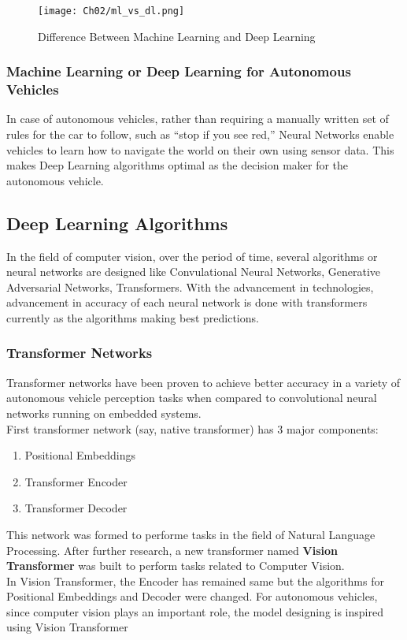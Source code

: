 \begin{figure}[h]
    \centering
    \texttt{[image: Ch02/ml\_vs\_dl.png]}
    \caption{Difference Between Machine Learning and Deep Learning}
    \label{figure:2}
\end{figure}
\FloatBarrier

\subsubsection{Machine Learning or Deep Learning for Autonomous Vehicles}
In case of autonomous vehicles, rather than requiring a manually written set of rules for the car to follow, such as “stop if you see red,” Neural Networks enable vehicles to learn how to navigate the world on their own using sensor data. This makes Deep Learning algorithms optimal as the decision maker for the autonomous vehicle. 

\subsection{Deep Learning Algorithms}
In the field of computer vision, over the period of time, several algorithms or neural networks are designed like Convulational Neural Networks, Generative Adversarial Networks, Transformers. With the advancement in technologies, advancement in accuracy of each neural network is done with transformers currently as the algorithms making best predictions.

\subsubsection{Transformer Networks}
Transformer networks have been proven to achieve better accuracy in a variety of autonomous vehicle perception tasks when compared to convolutional neural networks running on embedded systems.
\\
First transformer network (say, native transformer)\cite{2017arXiv170603762V} has 3 major components:
\begin{enumerate}
    \item Positional Embeddings
    \item Transformer Encoder
    \item Transformer Decoder
\end{enumerate}
This network was formed to performe tasks in the field of Natural Language Processing. After further research, a new transformer named \textbf{Vision Transformer}\cite{dosovitskiy2021image} was built to perform tasks related to Computer Vision.
\\
In Vision Transformer, the Encoder has remained same but the algorithms for Positional Embeddings and Decoder were changed.
For autonomous vehicles, since computer vision plays an important role, the model designing is inspired using Vision Transformer

